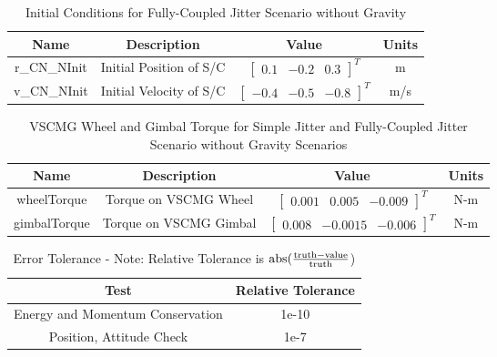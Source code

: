 \begin{table}[htbp]
	\caption{Initial Conditions for Fully-Coupled Jitter Scenario without Gravity}
	\label{tab:initial2}
	\centering \fontsize{10}{10}\selectfont
	\begin{tabular}{ c | c | c | c } %
		\hline
		\textbf{Name}  & \textbf{Description}  & \textbf{Value} & \textbf{Units} \\
		\hline
		r\_CN\_NInit & Initial Position of S/C & $\begin{bmatrix}
		0.1 &	-0.2 & 0.3
		\end{bmatrix}^T$ & m \\
		v\_CN\_NInit & Initial Velocity of S/C & $\begin{bmatrix}
		-0.4 & -0.5 & -0.8
		\end{bmatrix}^T$ & m/s \\
		\hline
	\end{tabular}
\end{table}

\begin{table}[htbp]
	\caption{VSCMG Wheel and Gimbal Torque for Simple Jitter and Fully-Coupled Jitter Scenario without Gravity Scenarios}
	\label{tab:initial3}
	\centering \fontsize{10}{10}\selectfont
	\begin{tabular}{ c | c | c | c } %
		\hline
		\textbf{Name}  & \textbf{Description}  & \textbf{Value} & \textbf{Units} \\
		\hline
		wheelTorque & Torque on VSCMG Wheel & $\begin{bmatrix}
		0.001 &	 0.005 & -0.009
		\end{bmatrix}^T$ & N-m \\
		gimbalTorque & Torque on VSCMG Gimbal & $\begin{bmatrix}
		0.008 & -0.0015 & -0.006
		\end{bmatrix}^T$ & N-m \\
		\hline
	\end{tabular}
\end{table}

\begin{table}[htbp]
	\caption{Error Tolerance - Note: Relative Tolerance is $\textnormal{abs}(\frac{\textnormal{truth} - \textnormal{value}}{\textnormal{truth}}$)}
	\label{tab:errortol}
	\centering \fontsize{10}{10}\selectfont
	\begin{tabular}{| c | c |} %
		\hline
		Test   & Relative Tolerance \\
		\hline
		Energy and Momentum Conservation & 1e-10 \\
		\hline
		Position, Attitude Check & 1e-7 \\
		\hline	
	\end{tabular}
\end{table}

